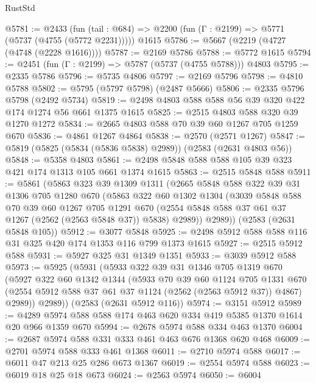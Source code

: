 \begin{lexlean}{RustStd}
\begin{coremodule}
{\begin{coremodule}
{{{{{{{{{{{{{{{@5781 := @2433
    (fun (tail : @684) => @2200 (fun (Γ : @2199) => @5771 (@5737 (@4755 (@5772 @2231)))))
    @1615
@5786 := @5667 (@2219 (@4727 (@4748 (@2228 @1616))))
@5787 := @2169 @5786
@5788 := @5772 @1615
@5794 := @2451 (fun (Γ : @2199) => @5787 (@5737 (@4755 @5788))) @4803
@5795 := @2335 @5786
@5796 := @5735 @4806
@5797 := @2169 @5796
@5798 := @4810 @5788
@5802 := @5795 (@5797 @5798) (@2487 @5666)
@5806 := @2335 @5796 @5798 (@2492 @5734)
@5819 := @2498 @4803 @588 @588 @56 @39 @320 @422 @174 @1274 @56 @661 @1375 @1615
@5825 := @2515 @4803 @588 @320 @39 @1270 @1272
@5834 := @2665 @4803 @588 @70 @39 @60 @1267 @705 @1259 @670
@5836 := @4861 @1267 @4864
@5838 := @2570 (@2571 @1267)
@5847 := @5819 (@5825 (@5834 (@5836 @5838) @2989)) (@2583 (@2631 @4803 @56))
@5848 := @5358 @4803
@5861 := @2498 @5848 @588 @588 @105 @39 @323 @421 @174 @1313 @105 @661 @1374 @1615
@5863 := @2515 @5848 @588
@5911 := @5861
    (@5863
      @323
      @39
      @1309
      @1311
      (@2665
        @5848
        @588
        @322
        @39
        @31
        @1306
        @705
        @1280
        @670
        (@5863
          @322
          @60
          @1302
          @1304
          (@3039
            @5848
            @588
            @70
            @39
            @60
            @1267
            @705
            @1291
            @670
            (@2554 @5848 @588 @37 @61 @37 @1267 (@2562 (@2563 @5848 @37)) @5838)
            @2989))
        @2989))
    (@2583 (@2631 @5848 @105))
@5912 := @3077 @5848
@5925 := @2498 @5912 @588 @588 @116 @31 @325 @420 @174 @1353 @116 @799 @1373 @1615
@5927 := @2515 @5912 @588
@5931 := @5927 @325 @31 @1349 @1351
@5933 := @3039 @5912 @588
@5973 := @5925
    (@5931
      (@5933
        @322
        @39
        @31
        @1346
        @705
        @1319
        @670
        (@5927
          @322
          @60
          @1342
          @1344
          (@5933
            @70
            @39
            @60
            @1124
            @705
            @1331
            @670
            (@2554 @5912 @588 @37 @61 @37 @1124 (@2562 (@2563 @5912 @37)) @4867)
            @2989))
        @2989))
    (@2583 (@2631 @5912 @116))
@5974 := @3151 @5912
@5989 := @4289 @5974 @588 @588 @174 @463 @620 @334 @419 @5385 @1370 @1614 @20 @966 @1359 @670
@5994 := @2678 @5974 @588 @334 @463 @1370
@6004 := @2687 @5974 @588 @331 @333 @461 @463 @676 @1368 @620 @468
@6009 := @2701 @5974 @588 @333 @461 @1368
@6011 := @2710 @5974 @588
@6017 := @6011 @47 @213 @25 @286 @673 @1367
@6019 := @2554 @5974 @588
@6023 := @6019 @18 @25 @18 @673
@6024 := @2563 @5974
@6050 := @6004
}}}}}}}}}}}}}}}
\end{coremodule}}
\end{coremodule}
\end{lexlean}

